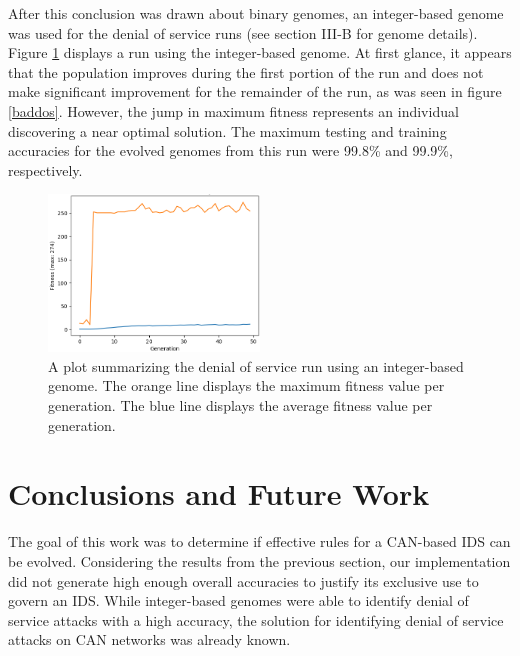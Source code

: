 \documentclass[10pt,conference]{IEEEtran}
\begin{document}
After this conclusion was drawn about binary genomes, an integer-based genome was used for the denial of service runs (see section III-B for genome details).  Figure \ref{gooddos} displays a run using the integer-based genome.  At first glance, it appears that the population improves during the first portion of the run and does not make significant improvement for the remainder of the run, as was seen in figure \ref{baddos}.  However, the jump in maximum fitness represents an individual discovering a near optimal solution.  The maximum testing and training accuracies for the evolved genomes from this run were 99.8\% and 99.9\%, respectively.  

\begin{figure}[b]
    \centering
    \includegraphics[width=0.5\textwidth]{good-dos-cropped.png}
    \caption{A plot summarizing the denial of service run using an integer-based genome.  The orange line displays the maximum fitness value per generation.  The blue line displays the average fitness value per generation.}
    \label{gooddos}
\end{figure}

\section{Conclusions and Future Work}

The goal of this work was to determine if effective rules for a CAN-based IDS can be evolved.  Considering the results from the previous section, our implementation did not generate high enough overall accuracies to justify its exclusive use to govern an IDS.  While integer-based genomes were able to identify denial of service attacks with a high accuracy, the solution for identifying denial of service attacks on CAN networks was already known.  
\end{document}
